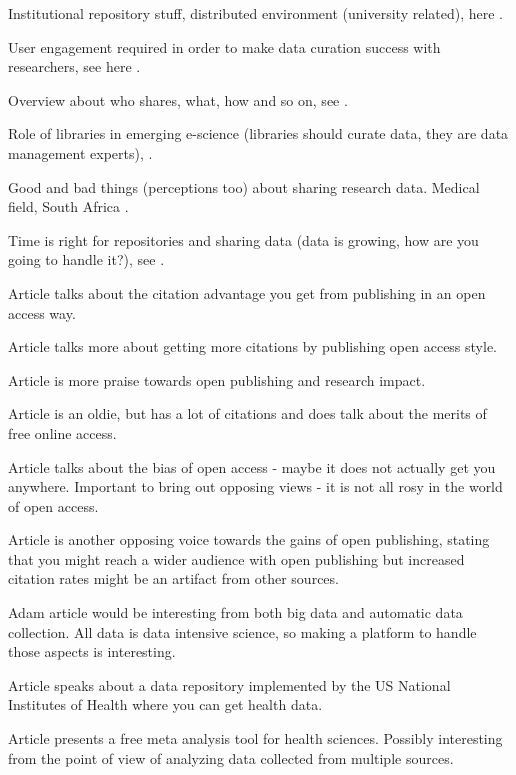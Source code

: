 Institutional repository stuff, distributed environment (university related),
here \cite{DBLP:journals/libt/Witt08}.

User engagement required in order to make data curation success with
researchers, see here \cite{DBLP:conf/ercimdl/Martinez-UribeM09}.

Overview about who shares, what, how and so on, see
\cite{borgman2010research}.

Role of libraries in emerging e-science (libraries should curate data, they are
data management experts), \cite{heidorn2011emerging}.

Good and bad things (perceptions too) about sharing research data. Medical
field, South Africa \cite{denny2015developing}.

Time is right for repositories and sharing data (data is growing, how are you
going to handle it?), see \cite{lynch2008big}.

Article \cite{eysenbach2006citation} talks about the citation advantage you get
from publishing in an open access way.

Article \cite{DBLP:journals/oir/XiaN12} talks more about getting more citations
by publishing open access style.

Article \cite{antelman2004open} is more praise towards open publishing and
research impact.

Article \cite{lawrence2001free} is an oldie, but has a lot of citations and
does talk about the merits of free online access.

Article \cite{DBLP:journals/joi/CraigPMPA07} talks about the bias of open
access - maybe it does not actually get you anywhere. Important to bring out
opposing views - it is not all rosy in the world of open access.

Article \cite{davis2008open} is another opposing voice towards the gains of
open publishing, stating that you might reach a wider audience with open
publishing but increased citation rates might be an artifact from other
sources.

Adam article \cite{DBLP:conf/sigmod/NothaftMDZLYKAH15} would be interesting from
both big data and automatic data collection. All data is data intensive
science, so making a platform to handle those aspects is interesting.

Article \cite{cimino2010clinical} speaks about a data repository implemented
by the US National Institutes of Health where you can get health data.

Article \cite{bax2006development} presents a free meta analysis tool for health
sciences. Possibly interesting from the point of view of analyzing data
collected from multiple sources.

